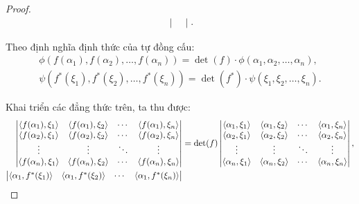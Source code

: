 \documentclass[class=nhvh-linear-algebra,crop=false]{standalone}
\begin{document}
\begin{proof}
\[\begin{split}
\begin{vmatrix}
                                                         \end{vmatrix}.
        \end{split}
    \]
    \par Theo định nghĩa định thức của tự đồng cấu:
    \[
        \begin{split}
            \phi(f(\alpha_{1}), f(\alpha_{2}), \ldots, f(\alpha_{n})) = \det(f)\cdot\phi(\alpha_{1}, \alpha_{2}, \ldots, \alpha_{n}), \\
            \psi(f^{*}(\xi_{1}), f^{*}(\xi_{2}), \ldots, f^{*}(\xi_{n})) = \det(f^{*})\cdot\psi(\xi_{1}, \xi_{2}, \ldots, \xi_{n}).
        \end{split}
    \]
    \par Khai triển các đẳng thức trên, ta thu được:
    \begingroup{}
    \allowdisplaybreaks{}
    \begin{align*}
        \begin{vmatrix}
            \left\langle{f(\alpha_{1}),\xi_{1}}\right\rangle & \left\langle{f(\alpha_{1}),\xi_{2}}\right\rangle & \cdots & \left\langle{f(\alpha_{1}),\xi_{n}}\right\rangle \\
            \left\langle{f(\alpha_{2}),\xi_{1}}\right\rangle & \left\langle{f(\alpha_{2}),\xi_{2}}\right\rangle & \cdots & \left\langle{f(\alpha_{2}),\xi_{n}}\right\rangle \\
            \vdots                          & \vdots                          & \ddots & \vdots                          \\
            \left\langle{f(\alpha_{n}),\xi_{1}}\right\rangle & \left\langle{f(\alpha_{n}),\xi_{2}}\right\rangle & \cdots & \left\langle{f(\alpha_{n}),\xi_{n}}\right\rangle \\
        \end{vmatrix}
         & = \det(f)
        \begin{vmatrix}
            \left\langle{\alpha_{1},\xi_{1}}\right\rangle & \left\langle{\alpha_{1},\xi_{2}}\right\rangle & \cdots & \left\langle{\alpha_{1},\xi_{n}}\right\rangle \\
            \left\langle{\alpha_{2},\xi_{1}}\right\rangle & \left\langle{\alpha_{2},\xi_{2}}\right\rangle & \cdots & \left\langle{\alpha_{2},\xi_{n}}\right\rangle \\
            \vdots                       & \vdots                       & \ddots & \vdots                       \\
            \left\langle{\alpha_{n},\xi_{1}}\right\rangle & \left\langle{\alpha_{n},\xi_{2}}\right\rangle & \cdots & \left\langle{\alpha_{n},\xi_{n}}\right\rangle \\
        \end{vmatrix}, \\
        \begin{vmatrix}
            \left\langle{\alpha_{1},f^{*}(\xi_{1})}\right\rangle & \left\langle{\alpha_{1},f^{*}(\xi_{2})}\right\rangle & \cdots & \left\langle{\alpha_{1},f^{*}(\xi_{n})}\right\rangle \\

\end{vmatrix}
\end{align*}
\end{proof}
\end{document}
